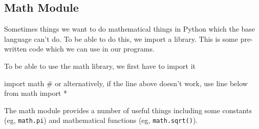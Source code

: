 \subsection*{Math Module}
Sometimes things we want to do mathematical things in Python which the base language can't do. To be able to do this, we import a library. This is some pre-written code which we can use in our programs.

To be able to use the math library, we first have to import it
\begin{python}
import math
# or alternatively, if the line above doesn't work, use line below
from math import *
\end{python}
The math module provides a number of useful things including some constants (eg, \verb|math.pi|) and mathematical functions (eg, \verb|math.sqrt()|). 